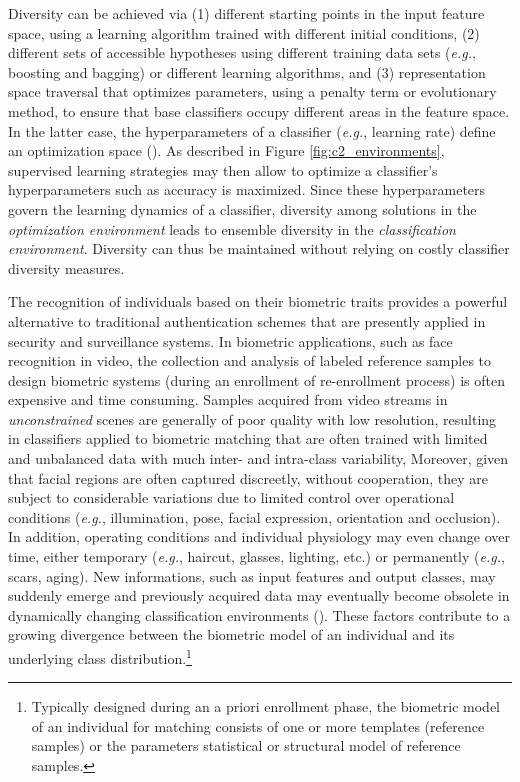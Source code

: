 Diversity can be achieved via (1) different starting points in the input feature space, using a learning algorithm trained with different initial conditions, (2) different sets of accessible hypotheses using different training data sets (\emph{e.g.}, boosting and bagging) or different learning algorithms, and (3) representation space traversal that optimizes parameters, using a penalty term or evolutionary method, to ensure that base classifiers occupy different areas in the feature space.
In the latter case, the hyperparameters of a classifier (\emph{e.g.}, learning rate) define an optimization space (\cite{granger07}).
As described in Figure \ref{fig:c2_environments}, supervised learning strategies may then allow to optimize a classifier's hyperparameters such as accuracy is maximized.
Since these hyperparameters govern the learning dynamics of a classifier, diversity among solutions in the \emph{optimization environment} leads to ensemble diversity in the \emph{classification environment}.
Diversity can thus be maintained without relying on costly classifier diversity measures.

The recognition of individuals based on their biometric traits provides a powerful alternative to traditional authentication schemes that are presently applied in security and surveillance systems.
In biometric applications, such as face recognition in video, the collection and analysis of labeled reference samples to design biometric systems (during an enrollment of re-enrollment process) is often expensive and time consuming.
Samples acquired from video streams in \emph{unconstrained} scenes are generally of poor quality with low resolution, resulting in classifiers applied to biometric matching that are often trained with limited and unbalanced data with much inter- and intra-class variability, 
Moreover, given that facial regions are often captured discreetly, without cooperation, they are subject to considerable variations due to limited control over operational conditions (\emph{e.g.}, illumination, pose, facial expression, orientation and occlusion).
In addition, operating conditions and individual physiology may even change over time, either temporary (\emph{e.g.}, haircut, glasses, lighting, etc.) or permanently (\emph{e.g.}, scars, aging).
New informations, such as input features and output classes, may suddenly emerge and previously acquired data may eventually become obsolete in dynamically changing classification environments (\cite{granger01, tsymbal08}).
These factors contribute to a growing divergence between the biometric model of an individual and its underlying class distribution.\footnote{Typically designed during an a priori enrollment phase, the biometric model of an individual for matching consists of one or more templates (reference samples) or the parameters statistical or structural model of reference samples.}

